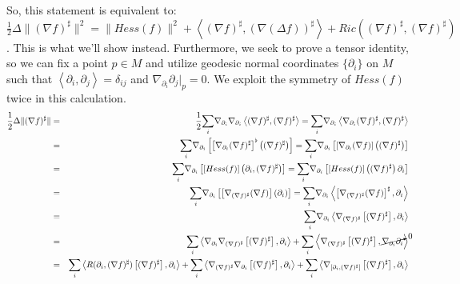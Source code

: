 \documentclass{article}
\begin{document}
So, this statement is equivalent to: $\frac{1}{2} \Delta \| (\nabla f)^\sharp \| ^2 = \| Hess(f) \| ^2 + \left\langle (\nabla f)^\sharp, (\nabla(\Delta f))^\sharp \right\rangle + Ric((\nabla f)^\sharp,(\nabla f)^\sharp)$. This is what we'll show instead. Furthermore, we seek to prove a tensor identity, so we can fix a point $p\in M$ and utilize geodesic normal coordinates $\{ \partial _i\}$ on $M$ such that $\left\langle \partial _i, \partial _j \right\rangle = \delta_{ij}$ and $\nabla _{\partial _i} \partial_j |_p = 0$. We exploit the symmetry of $Hess(f)$ twice in this calculation.
\begin{eqnarray*}
\frac{1}{2} \Delta \| (\nabla f) ^\sharp \| & = & \frac{1}{2} \displaystyle{\sum_i} \nabla _{\partial_i} \nabla _{\partial_i} \left\langle (\nabla f)^\sharp , (\nabla f)^\sharp \right\rangle
 = \displaystyle{\sum_i} \nabla _{\partial_i} \left\langle  \nabla _{\partial_i} (\nabla f)^\sharp , (\nabla f)^\sharp \right\rangle \\
 & = & \displaystyle{\sum_i} \nabla _{\partial_i} \left[ \left[ \nabla _{\partial_i} (\nabla f)^\sharp \right]^\flat \left( (\nabla f)^\sharp \right) \right]
 = \displaystyle{\sum_i} \nabla _{\partial_i} \left[ \left[ \nabla _{\partial_i} (\nabla f)\right] \left( (\nabla f)^\sharp \right) \right]  \\
 & = & \displaystyle{\sum_i} \nabla _{\partial_i} \left[ \left[ Hess(f) \right] \left( \partial_i , (\nabla f)^\sharp \right) \right]
 = \displaystyle{\sum_i} \nabla _{\partial_i} \left[ \left[ Hess(f) \right] \left((\nabla f)^\sharp \right) \partial_i \right] \\
 & = & \displaystyle{\sum_i} \nabla _{\partial_i} \left[ \left[ \nabla _{(\nabla f)^\sharp} (\nabla f)\right] \left(\partial_i \right) \right]
 = \displaystyle{\sum_i} \nabla _{\partial_i} \left\langle \left[ \nabla _{(\nabla f)^\sharp} (\nabla f) \right] ^\sharp, \partial_i \right\rangle  \\
 & = & \displaystyle{\sum_i} \nabla _{\partial_i} \left\langle \nabla _{(\nabla f)^\sharp} \left[  (\nabla f) ^\sharp \right] , \partial_i \right\rangle  \\
 & = & \displaystyle{\sum_i} \left\langle \nabla _{\partial_i} \nabla _{(\nabla f)^\sharp} \left[  (\nabla f) ^\sharp \right] , \partial_i \right\rangle  + \displaystyle{\sum_i} \left\langle \nabla _{(\nabla f)^\sharp} \left[  (\nabla f) ^\sharp \right] , \cancelto{0}{\nabla _{\partial_i} \partial_i } \right\rangle  \\
 & = & \displaystyle{\sum_i} \left\langle R( \partial_i , (\nabla f)^\sharp ) \left[  (\nabla f) ^\sharp \right] , \partial_i \right\rangle
 + \displaystyle{\sum_i} \left\langle \nabla _{(\nabla f)^\sharp} \nabla _{\partial_i} \left[  (\nabla f) ^\sharp \right] , \partial_i \right\rangle
 + \displaystyle{\sum_i} \left\langle \nabla _{\left[ \partial_i , (\nabla f) ^\sharp \right]} \left[  (\nabla f) ^\sharp \right] , \partial_i \right\rangle
\end{eqnarray*}
\end{document}
